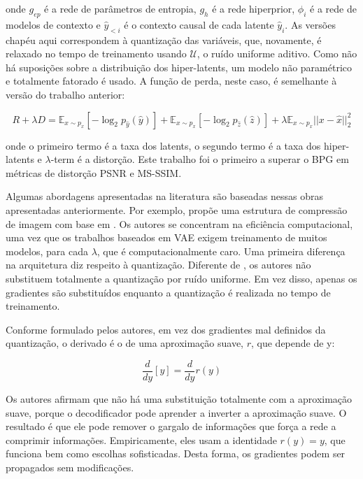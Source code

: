 onde $g_{ep}$ é a rede de parâmetros de entropia, $g_h$ é a rede hiperprior, $\phi_i$ é a rede de modelos de contexto e $\hat{y}_{<i}$ é o contexto causal de cada latente $\hat{y}_i$. As versões chapéu aqui correspondem à quantização das variáveis, que, novamente, é relaxado no tempo de treinamento usando $\mathcal{U}$, o ruído uniforme aditivo. Como não há suposições sobre a distribuição dos hiper-latents, um modelo não paramétrico e totalmente fatorado é usado. A função de perda, neste caso, é semelhante à versão do trabalho anterior:

\begin{equation}
R + \lambda D = \mathbb{E}_{x \sim p_x}[-\log_2 p_{\hat{y}}(\hat{y})] + \mathbb{E}_{x \sim p_x}[-\log_2 p_{\hat{z}}(\hat{z})] + \lambda  \mathbb{E}_{x \sim p_x} ||x - \hat{x}||_2^2
\end{equation}

onde o primeiro termo é a taxa dos latents, o segundo termo é a taxa dos hiper-latents e $\lambda$-term é a distorção. Este trabalho foi o primeiro a superar o BPG em métricas de distorção PSNR e MS-SSIM.

Algumas abordagens apresentadas na literatura são baseadas nessas obras apresentadas anteriormente. Por exemplo, \cite{Lossy2017Theis} propõe uma estrutura de compressão de imagem com base em \cite{End2016Balle}. Os autores se concentram na eficiência computacional, uma vez que os trabalhos baseados em VAE exigem treinamento de muitos modelos, para cada $\lambda$, que é computacionalmente caro. Uma primeira diferença na arquitetura diz respeito à quantização. Diferente de \cite{End2016Balle}, os autores não substituem totalmente a quantização por ruído uniforme. Em vez disso, apenas os gradientes são substituídos enquanto a quantização é realizada no tempo de treinamento.

Conforme formulado pelos autores, em vez dos gradientes mal definidos da quantização, o derivado é o de uma aproximação suave, $r$, que depende de y:

\begin{equation}
\frac{d}{dy}[y] = \frac{d}{dy} r(y)
\end{equation}


Os autores afirmam que não há uma substituição totalmente com a aproximação suave, porque o decodificador pode aprender a inverter a aproximação suave. O resultado é que ele pode remover o gargalo de informações que força a rede a comprimir informações. Empiricamente, eles usam a identidade $r (y) = y$, que funciona bem como escolhas sofisticadas. Desta forma, os gradientes podem ser propagados sem modificações.

